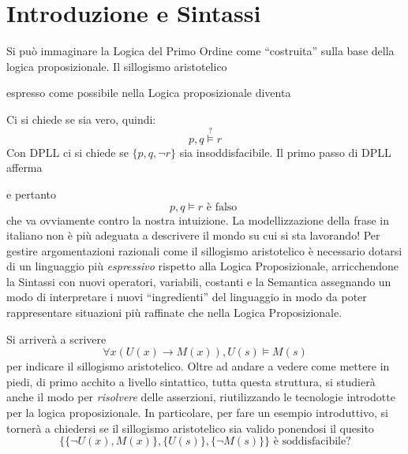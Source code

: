 
\chapter{Introduzione e Sintassi}
Si può immaginare la Logica del Primo Ordine come ``costruita'' 
sulla base della logica proposizionale. Il sillogismo aristotelico
\begin{prooftree}
\end{prooftree}
espresso come possibile nella Logica proposizionale diventa 
\begin{prooftree}
\end{prooftree}
Ci si chiede se sia vero, quindi: 
$$
p, q \stackrel ? \models r
$$
Con DPLL ci si chiede se 
$\{p, q, \neg r\}$ sia insoddisfacibile. 
Il primo passo di DPLL afferma
\begin{prooftree}
\end{prooftree}
e pertanto 
$$
p, q \models r \text{ è falso }
$$
che va ovviamente contro la nostra intuizione. La modellizzazione della frase in italiano non è più adeguata a descrivere il mondo su cui si sta lavorando!
Per gestire argomentazioni
razionali come il sillogismo aristotelico è necessario dotarsi di un linguaggio 
più \textit{espressivo} rispetto alla Logica Proposizionale, arricchendone 
la Sintassi con nuovi operatori, variabili, costanti e la Semantica assegnando 
un modo di interpretare i nuovi ``ingredienti'' del linguaggio in modo da poter 
rappresentare situazioni più raffinate che nella Logica Proposizionale. 

Si arriverà a scrivere 
$$
\forall x (U(x)\rightarrow M(x)), U(s) \models M(s)
$$
per indicare il sillogismo aristotelico.
Oltre ad andare a vedere come mettere in piedi, di primo acchito a livello sintattico, 
tutta questa struttura, si studierà anche il modo per \textit{risolvere} 
delle asserzioni, riutilizzando le tecnologie introdotte per la logica proposizionale.
In particolare, per fare un esempio introduttivo, si tornerà a chiedersi se 
il sillogismo aristotelico sia valido ponendosi  il quesito 
$$
\{\{\neg U(x), M(x)\}, \{U(s)\}, \{\neg M(s)\}\} \text{ è soddisfacibile?}
$$

